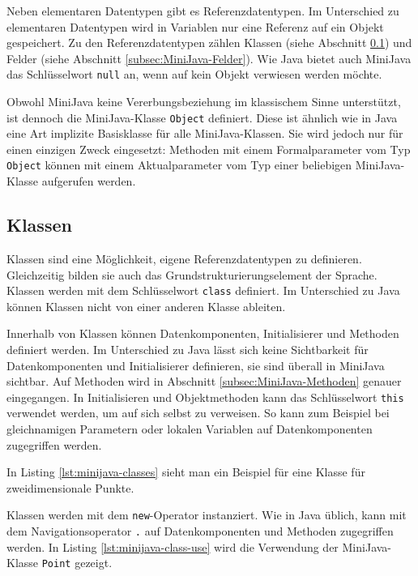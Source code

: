 Neben elementaren Datentypen gibt es Referenzdatentypen. Im Unterschied zu elementaren Datentypen wird in Variablen nur eine Referenz auf ein Objekt gespeichert. Zu den Referenzdatentypen zählen Klassen (siehe Abschnitt \ref{subsec:MiniJava-Klassen}) und Felder (siehe Abschnitt \ref{subsec:MiniJava-Felder}). Wie Java bietet auch MiniJava das Schlüsselwort \lstinline{null} an, wenn auf kein Objekt verwiesen werden möchte.

Obwohl MiniJava keine Vererbungsbeziehung im klassischem Sinne unterstützt, ist dennoch die MiniJava-Klasse \lstinline{Object} definiert. Diese ist ähnlich wie in Java eine Art implizite Basisklasse für alle MiniJava-Klassen. Sie wird jedoch nur für einen einzigen Zweck eingesetzt: Methoden mit einem Formalparameter vom Typ \lstinline{Object} können mit einem Aktualparameter vom Typ einer beliebigen MiniJava-Klasse aufgerufen werden.

\subsection{Klassen}
\label{subsec:MiniJava-Klassen}

Klassen sind eine Möglichkeit, eigene Referenzdatentypen zu definieren. Gleichzeitig bilden sie auch das Grundstrukturierungselement der Sprache. Klassen werden mit dem Schlüsselwort \lstinline{class} definiert. Im Unterschied zu Java können Klassen nicht von einer anderen Klasse ableiten.

Innerhalb von Klassen können Datenkomponenten, Initialisierer und Methoden definiert werden. Im Unterschied zu Java lässt sich keine Sichtbarkeit für Datenkomponenten und Initialisierer definieren, sie sind überall in MiniJava sichtbar. Auf Methoden wird in Abschnitt \ref{subsec:MiniJava-Methoden} genauer eingegangen. In Initialisieren und Objektmethoden kann das Schlüsselwort \lstinline{this} verwendet werden, um auf sich selbst zu verweisen. So kann zum Beispiel bei gleichnamigen Parametern oder lokalen Variablen auf Datenkomponenten zugegriffen werden.

In Listing \ref{lst:minijava-classes} sieht man ein Beispiel für eine Klasse für zweidimensionale Punkte.



Klassen werden mit dem \lstinline{new}-Operator instanziert. Wie in Java üblich, kann mit dem Navigationsoperator \lstinline{.} auf Datenkomponenten und Methoden zugegriffen werden. In Listing \ref{lst:minijava-class-use} wird die Verwendung der MiniJava-Klasse \lstinline{Point} gezeigt.

